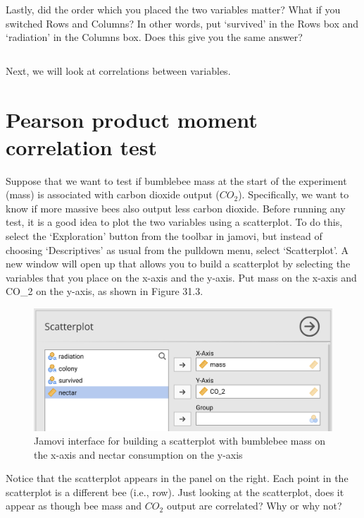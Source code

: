 \documentclass[
  openany]{krantz}
\begin{document}
Lastly, did the order which you placed the two variables matter?
What if you switched Rows and Columns?
In other words, put `survived' in the Rows box and `radiation' in the Columns box.
Does this give you the same answer?

\begin{verbatim}

\end{verbatim}

Next, we will look at correlations between variables.

\hypertarget{pearson-product-moment-correlation-test}{%
\section{Pearson product moment correlation test}\label{pearson-product-moment-correlation-test}}

Suppose that we want to test if bumblebee mass at the start of the experiment (mass) is associated with carbon dioxide output (\(CO_{2}\)).
Specifically, we want to know if more massive bees also output less carbon dioxide.
Before running any test, it is a good idea to plot the two variables using a scatterplot.
To do this, select the `Exploration' button from the toolbar in jamovi, but instead of choosing `Descriptives' as usual from the pulldown menu, select `Scatterplot'.
A new window will open up that allows you to build a scatterplot by selecting the variables that you place on the x-axis and the y-axis.
Put mass on the x-axis and CO\_2 on the y-axis, as shown in Figure 31.3.

\begin{figure}
\includegraphics[width=1\linewidth]{img/jamovi_simple_scatterplot} \caption{Jamovi interface for building a scatterplot with bumblebee mass on the x-axis and nectar consumption on the y-axis}\label{fig:unnamed-chunk-134}
\end{figure}

Notice that the scatterplot appears in the panel on the right.
Each point in the scatterplot is a different bee (i.e., row).
Just looking at the scatterplot, does it appear as though bee mass and \(CO_2\) output are correlated?
Why or why not?
\end{document}
